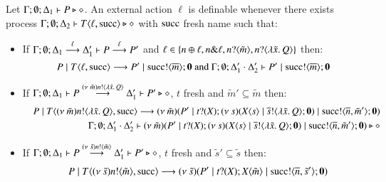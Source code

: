 \begin{definition}[Definibility]\rm
	Let $\Gamma; \emptyset; \Delta_1 \vdash P \triangleright \diamond$.
	An external action $\ell$ is definable whenever
	there exists process
	$\Gamma; \emptyset; \Delta_2 \vdash T\langle \ell, \textrm{succ} \rangle \triangleright \diamond$
	with $\textrm{succ}$ fresh name %
	such that:
%
	\begin{itemize}
		\item	If $\Gamma; \emptyset; \Delta_1 \stackrel{\ell}{\longrightarrow} \Delta_1' \vdash P \stackrel{\ell}{\longrightarrow} P'$ and
			$\ell \in \{n \oplus \ell, n \& \ell, n ? \langle \tilde{m} \rangle, n ? \langle \lambda \tilde{x}.\,Q \rangle\}$
			then:
%
\[
			P \;|\; T\langle \ell, \textrm{succ} \rangle \longrightarrow P' \;|\; \textrm{succ} ! \langle \overline{m} \rangle ; \mathbf{0} \textrm{ and }
			\Gamma; \emptyset; \Delta_1' \cdot \Delta_2' \vdash P' \;|\; \textrm{succ} ! \langle \overline{m} \rangle ; \mathbf{0}
\]
%
		\item	If $\Gamma; \emptyset; \Delta_1 \vdash P \stackrel{(\nu\ \tilde{m})n ! \langle \lambda \tilde{x}.\,Q \rangle}{\longrightarrow} \Delta_1' \vdash P' \triangleright \diamond$,
			$t$ fresh
			and $\tilde{m}' \subseteq \tilde{m}$
			then:
%
			\begin{eqnarray*}
				& & P \;|\; T\langle (\nu\ \tilde{m})n ! \langle \lambda \tilde{x}.\,Q \rangle, \textrm{succ} \rangle \longrightarrow
				(\nu\ \tilde{m})(P' \;|\; t ? (X) ; (\nu\ s)(X\langle s \rangle \;|\; \overline{s} ! \langle \lambda \tilde{x}.\,Q \rangle ; \mathbf{0}) \;|\; \textrm{succ} ! \langle \overline{n}, \tilde{m}' \rangle ; \mathbf{0})\\
				& & \Gamma; \emptyset; \Delta_1' \cdot \Delta_2' \vdash
				(\nu\ \tilde{m})(P' \;|\; t ? (X) ; (\nu\ s)(X\langle s \rangle \;|\; \overline{s} ! \langle \lambda \tilde{x}.\,Q \rangle ; \mathbf{0}) \;|\;  \textrm{succ} ! \langle \overline{n}, \tilde{m}' \rangle ; \mathbf{0}) \triangleright \diamond\\
			\end{eqnarray*}
%
		\item	If $\Gamma; \emptyset; \Delta_1 \vdash P \stackrel{(\nu\ \tilde{s})n ! \langle \tilde{m} \rangle}{\longrightarrow} \Delta_1' \vdash P' \triangleright \diamond$,
			$t$ fresh
			and $\tilde{s}' \subseteq \tilde{s}$
			then:
%
			\begin{eqnarray*}
				& & P \Par T\lrangle{\news{\tilde{s}}\bactout{n}{\tilde{m}}, \suc} \red \newsp{\tilde{s}}{P' \Par \fotrigger{t}{\tilde{m}} \Par \bout{\suc}{\dual{n}, \tilde{s}'} \inact}\\

\end{eqnarray*}
\end{itemize}
\end{definition}
